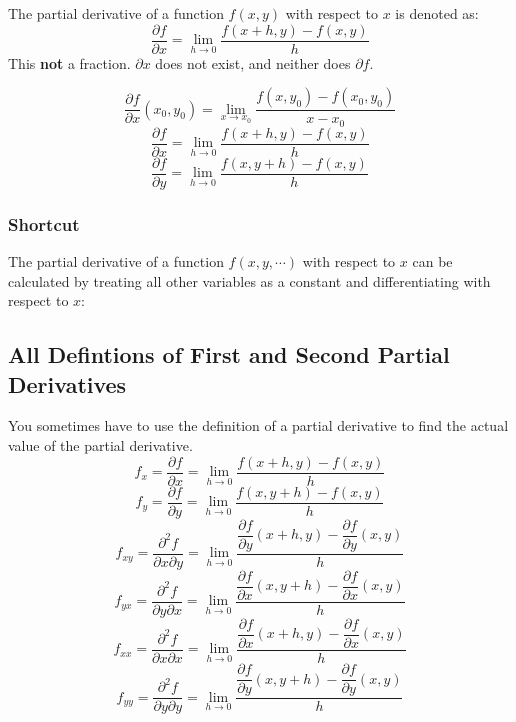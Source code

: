 \documentclass[a4paper,12pt,openany]{book}
\newcommand{\pd}[2]{\dfrac{\partial #1}{\partial #2}}
\newcommand{\pdm}[3]{\dfrac{\partial^2 #1}{\partial #2 \partial #3}}
\begin{document}
The partial derivative of a function \(f(x, y)\) with respect to \(x\) is denoted as:
\[
    \pd{f}{x} = \lim_{h \to 0} \dfrac{f(x+h, y) - f(x, y)}{h}
\]
This \textbf{not} a fraction. $\partial x$ does not exist, and neither does $\partial f$.

\begin{equation}
    \pd{f}{x}(x_0, y_0) = 
    \lim_{x \to x_0} \dfrac{f(x, y_0) - f(x_0, y_0)}{x-x_0}
\end{equation}
\begin{equation}
    \pd{f}{x} = \lim_{h \to 0} \dfrac{f(x+h, y) - f(x, y)}{h}
\end{equation}
\begin{equation}
    \pd{f}{y} = \lim_{h \to 0} \dfrac{f(x, y+h) - f(x, y)}{h}
\end{equation}

\subsubsection{Shortcut}
The partial derivative of a function \(f(x, y, \cdots)\) with respect to \(x\) can be calculated by treating all other variables as a constant and differentiating with respect to \(x\):

\subsection{All Defintions of First and Second Partial Derivatives}
You sometimes have to use the definition of a partial derivative to find the actual value of the partial derivative. 
\begin{equation}
    f_x = \pd{f}{x} = \lim_{h \to 0} \dfrac{f(x+h, y) - f(x, y)}{h}
\end{equation}
\begin{equation}
    f_y = \pd{f}{y} = \lim_{h \to 0} \dfrac{f(x, y+h) - f(x, y)}{h}
\end{equation}
\begin{equation}
    f_{xy} = \pdm{f}{x}{y} = \lim_{h \to 0} \dfrac{\pd{f}{y}(x+h, y) - \pd{f}{y}(x, y)}{h}
\end{equation}
\begin{equation}
    f_{yx} = \pdm{f}{y}{x} = \lim_{h \to 0} \dfrac{\pd{f}{x}(x, y+h) - \pd{f}{x}(x, y)}{h}
\end{equation}
\begin{equation}
    f_{xx} = \pdm{f}{x}{x} = \lim_{h \to 0} \dfrac{\pd{f}{x}(x+h, y) - \pd{f}{x}(x, y)}{h}
\end{equation}
\begin{equation}
    f_{yy} = \pdm{f}{y}{y} = \lim_{h \to 0} \dfrac{\pd{f}{y}(x, y+h) - \pd{f}{y}(x, y)}{h}
\end{equation}
\end{document}
